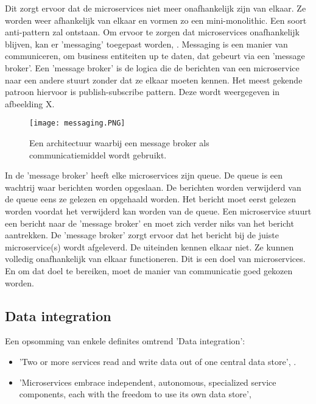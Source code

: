 Dit zorgt ervoor dat de microservices niet meer onafhankelijk zijn van elkaar. Ze worden weer afhankelijk van elkaar en vormen zo een mini-monolithic. Een soort anti-pattern zal ontstaan. Om ervoor te zorgen dat microservices onafhankelijk blijven, kan er 'messaging' toegepast worden, \textcite{Solance2018}. Messaging is een manier van communiceren, om business entiteiten up te daten, dat gebeurt via een 'message broker'. Een 'message broker' is de logica die de berichten van een microservice naar een andere stuurt zonder dat ze elkaar moeten kennen. Het meest gekende patroon hiervoor is publish-subscribe pattern. Deze wordt weergegeven in afbeelding X.
\begin{figure}[h!]
	\texttt{[image: messaging.PNG]}
	\centering
	\caption{Een architectuur waarbij een message broker als communicatiemiddel wordt gebruikt.}
\end{figure}
In de 'message broker' heeft elke microservices zijn queue. De queue is een wachtrij waar berichten worden opgeslaan. De berichten worden verwijderd van de queue eens ze gelezen en opgehaald worden. Het bericht moet eerst gelezen worden voordat het verwijderd kan worden van de queue. 
Een microservice stuurt een bericht naar de 'message broker' en moet zich verder niks van het bericht aantrekken. De 'message broker' zorgt ervoor dat het bericht bij de juiste microservice(s) wordt afgeleverd. De uiteinden kennen elkaar niet. Ze kunnen volledig onafhankelijk van elkaar functioneren. Dit is een doel van microservices. En om dat doel te bereiken, moet de manier van communicatie goed gekozen worden.

\subsection{Data integration}
Een opsomming van enkele definites omtrend 'Data integration':
	\begin{itemize}
		\item 'Two or more services read and write data out of one central data store', \textcite{Aradhye2018}.
		\item 'Microservices embrace independent, autonomous, specialized service components,
		each with the freedom to use its own data store', \textcite{Kumar2018}
	\end{itemize}

